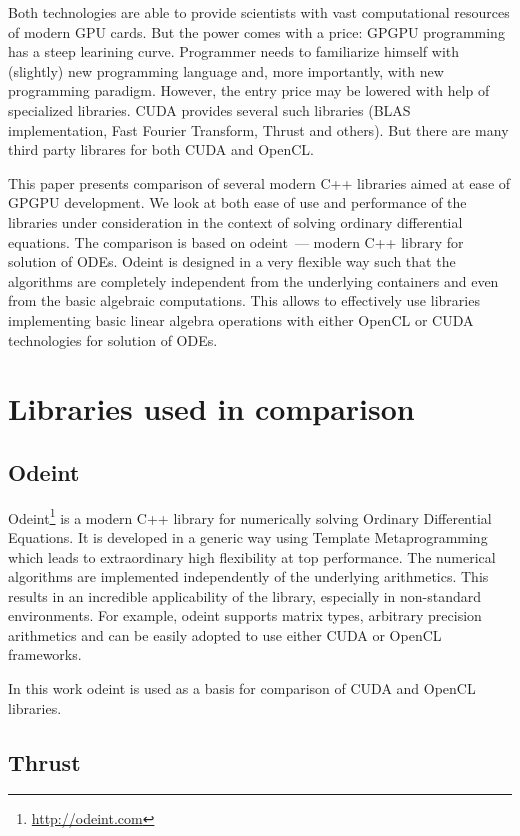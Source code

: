 \documentclass[1p]{elsarticle}
\begin{document}
Both technologies are able to provide scientists with vast computational
resources of modern GPU cards. But the power comes with a price: GPGPU
programming has a steep learining curve. Programmer needs to familiarize
himself with (slightly) new programming language and, more importantly, with
new programming paradigm. However, the entry price may be lowered with help of
specialized libraries. CUDA provides several such libraries (BLAS
implementation, Fast Fourier Transform, Thrust and others). But there are many
third party librares for both CUDA and OpenCL.

This paper presents comparison of several modern C++ libraries aimed at ease of
GPGPU development. We look at both ease of use and performance of the libraries
under consideration in the context of solving ordinary differential equations.
The comparison is based on odeint~--- modern C++ library for solution of ODEs.
Odeint is designed in a very flexible way such that the algorithms are
completely independent from the underlying containers and even from the basic
algebraic computations. This allows to effectively use libraries implementing
basic linear algebra operations with either OpenCL or CUDA technologies for
solution of ODEs.

\section{Libraries used in comparison}

\subsection{Odeint}

Odeint\footnote{\href{http://odeint.com}{http://odeint.com}}
is a modern C++ library for numerically solving Ordinary Differential
Equations. It is developed in a generic way using Template Metaprogramming
which leads to extraordinary high flexibility at top performance. The numerical
algorithms are implemented independently of the underlying arithmetics. This
results in an incredible applicability of the library, especially in
non-standard environments. For example, odeint supports matrix types, arbitrary
precision arithmetics and can be easily adopted to use either CUDA or OpenCL
frameworks.

In this work odeint is used as a basis for comparison of CUDA and OpenCL
libraries.

\subsection{Thrust}
\end{document}
